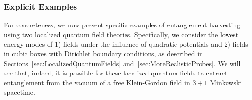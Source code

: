 \documentclass[letterpaper,12pt,titlepage,oneside,final]{book}
\newcommand{\mf}{\mathsf}%
\begin{document}



    \subsubsection*{Explicit Examples}

    
    For concreteness, we now present specific examples of entanglement harvesting using two localized quantum field theories. Specifically, we consider the lowest energy modes of 1) fields under the influence of quadratic potentials and 2) fields in cubic boxes with Dirichlet boundary conditions, as described in Sections~\ref{sec:LocalizedQuantumFields} and~\ref{sec:MoreRealisticProbes}. We will see that, indeed, it is possible for these localized quantum fields to extract entanglement from the vacuum of a free Klein-Gordon field in $3+1$ Minkowski spacetime.
\end{document}
